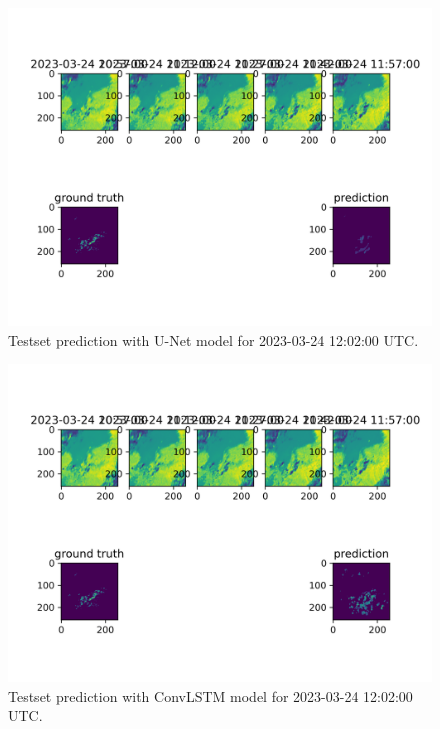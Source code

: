 \documentclass[acmtog, screen, balance]{acmart}
\begin{document}
\begin{figure}[hbp]
  \centering
  \includegraphics[width=500pt]{./images/experiment-0-unet.png}
  \caption{Testset prediction with U-Net model for 2023-03-24 12:02:00 UTC.}
  \Description{}
  \label{fig:unet}
\end{figure}
\begin{figure}[hbp]
  \centering
  \includegraphics[width=500pt]{./images/experiment-0.png}
  \caption{Testset prediction with ConvLSTM model for 2023-03-24 12:02:00 UTC.}
  \Description{}
  \label{fig:convclass}
\end{figure}
\end{document}
